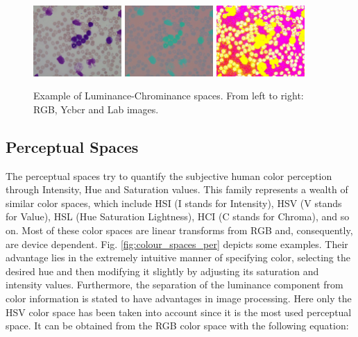 \documentclass[final,a4paper,12pt,english]{UnicaPhdThesis3}
\begin{document}
\begin{figure}[!h]
	\centering
	\includegraphics[width=0.3\textwidth]{images/figcs_rgb}
	\includegraphics[width=0.3\textwidth]{images/figcs_ycbcr}
	\includegraphics[width=0.3\textwidth]{images/figcs_lab}
	\caption{\label{fig:colour_spaces_lum}Example of Luminance-Chrominance spaces. From left to right: RGB, Ycbcr and Lab images.}
\end{figure}

\subsection{Perceptual Spaces}  %
The perceptual spaces try to quantify the subjective human color perception through Intensity, Hue and Saturation values. This family represents a wealth of similar color spaces, which include HSI (I stands for Intensity), HSV (V stands for Value), HSL (Hue Saturation Lightness), HCI (C stands for Chroma), and so on. Most of these color spaces are linear transforms from RGB and, consequently, are device dependent. Fig. \ref{fig:colour_spaces_per} depicts some examples. Their advantage lies in the extremely intuitive manner of specifying color, selecting the desired hue and then modifying it slightly by adjusting its saturation and intensity values.
Furthermore, the separation of the luminance component from color information is stated to have advantages in image processing. Here only the HSV color space has been taken into account since it is the most used perceptual space. It can be obtained from the RGB color space with the following equation:
\end{document}
